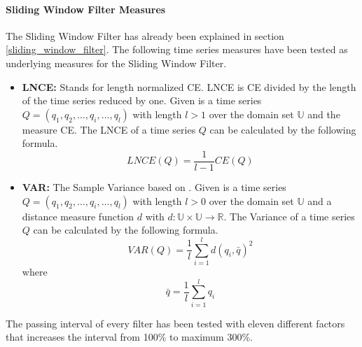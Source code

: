 \paragraph{Sliding Window Filter Measures} \label{sliding_window_filter_measures}
The Sliding Window Filter has already been explained in section \ref{sliding_window_filter}. The following time series
measures have been tested as underlying measures for the Sliding Window Filter.

\begin{itemize}
    \item \textbf{LNCE:} Stands for length normalized CE. LNCE is CE divided by the length of the time series reduced by
    one. Given is a time series $Q = (q_1, q_2, \dots, q_i, \dots, q_l)$ with length $l > 1$ over the domain set
    $\mathbb{U}$ and the measure CE. The LNCE of a time series $Q$ can be calculated by the following formula.
    \begin{equation}
        LNCE(Q) = \frac{1}{l - 1}CE(Q)
    \end{equation}
    \item \textbf{VAR:} The Sample Variance based on \cite{chan1983algorithms}. Given is a time series
    $Q = (q_1, q_2, \dots, q_i, \dots, q_l)$ with length $l > 0$ over the domain set $\mathbb{U}$ and a distance measure
    function $d$ with $d: \mathbb{U} \times \mathbb{U} \to \mathbb{R}$. The Variance of a time series $Q$ can be
    calculated by the following formula.
    \begin{equation}
        VAR(Q) = \frac{1}{l}\sum \limits_{i=1}^{l} d(q_i, \bar{q})^2
    \end{equation}
    where
    \begin{equation}
        \bar{q} = \frac{1}{l} \sum \limits_{i=1}^{l} q_i
    \end{equation}
\end{itemize}
The passing interval of every filter has been tested with eleven different factors that increases the interval from
100\% to maximum 300\%.
